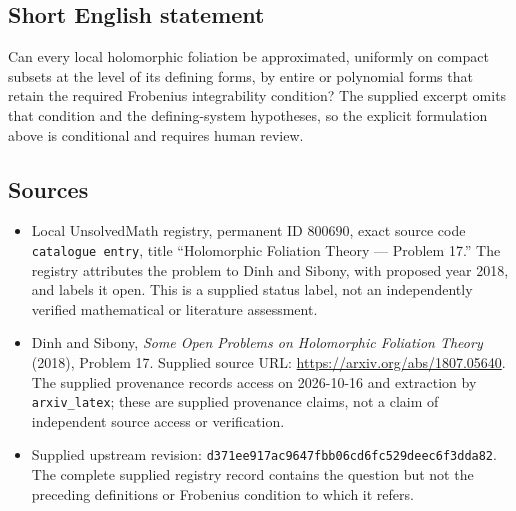 \documentclass[11pt]{article}
\begin{document}
\subsection{Short English statement}
Can every local holomorphic foliation be approximated, uniformly on compact subsets at the level of its defining forms, by entire or polynomial forms that retain the required Frobenius integrability condition? The supplied excerpt omits that condition and the defining-system hypotheses, so the explicit formulation above is conditional and requires human review.
\subsection{Sources}
\begin{itemize}
\item Local UnsolvedMath registry, permanent ID \(800690\), exact source code \texttt{catalogue entry}, title ``Holomorphic Foliation Theory --- Problem 17.'' The registry attributes the problem to Dinh and Sibony, with proposed year 2018, and labels it open. This is a supplied status label, not an independently verified mathematical or literature assessment.
\item Dinh and Sibony, \emph{Some Open Problems on Holomorphic Foliation Theory} (2018), Problem 17. Supplied source URL: \url{https://arxiv.org/abs/1807.05640}. The supplied provenance records access on 2026-10-16 and extraction by \texttt{arxiv\_latex}; these are supplied provenance claims, not a claim of independent source access or verification.
\item Supplied upstream revision: \texttt{d371ee917ac9647fbb06cd6fc529deec6f3dda82}. The complete supplied registry record contains the question but not the preceding definitions or Frobenius condition to which it refers.
\end{itemize}
\end{document}
